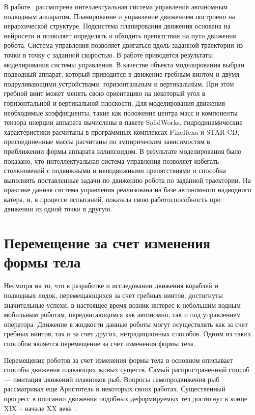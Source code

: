 В работе~\cite{Pshihopov_2014} рассмотрена интеллектуальная система управления автономным подводным аппаратом. Планирование и управление движением построено на иерархической структуре. Подсистема планирования движения основана на нейросети и позволяет определять и обходить препятствия на пути движения робота. Система управления позволяет двигаться вдоль заданной траектории из точки в точку с заданной скоростью. В работе приводятся результаты моделирования системы управления. В качестве объекта моделирования выбран подводный аппарат, который приводится в движение гребным винтом и двумя подруливающими устройствами: горизонтальным и вертикальным. При этом гребной винт может менять свою ориентацию на некоторый угол в горизонтальной и вертикальной плоскости. Для моделирования движения необходимые коэффициенты, такие как положение центра масс и компоненты тензора инерции аппарата вычислены в пакете SolidWorks, гидродинамические характеристики расчитаны в программных комплексах FineHexa и STAR CD, присоединенные массы расчитаны по эмпирическим зависимостям в приближении формы аппарата эллипсоидом. В результате моделирования было показано, что интеллектуальная система управления позволяет избегать столкновений с подвижными и неподвижными препятствиями и способна выполнять поставленные задачи по движению робота по заданной траектории. На практике данная система управления реализована на базе автономного надводного катера, и, в процессе испытаний, показала свою работоспособность при движении из одной точки в другую.



\section{Перемещение за счет изменения формы тела}\label{sec:ch1/sec3}

Несмотря на то, что в разработке и исследовании движения кораблей и подводных лодок, перемещающихся за счет гребных винтов, достигнуты значительные успехи, в настоящее время возник интерес к небольшим водным мобильным роботам, передвигающимся как автономно, так и под управлением оператора. Движение в жидкости данные роботы могут осуществлять как за счет гребных винтов, так и за счет других, нетрадиционных способов. Одним из таких способов является перемещение за счет изменения формы тела.

Перемещение роботов за счет изменения формы тела в основном описывает способы движения плавающих живых существ. Самый распространенный способ --- имитация движений плавников рыб. Вопросы самопродвижения рыб рассматривал еще Аристотель в некоторых своих работах. Существенный прогресс в описании движения подобных деформируемых тел достигнут в конце XIX -- начале XX века~\cite{Alexander_1983}. 

